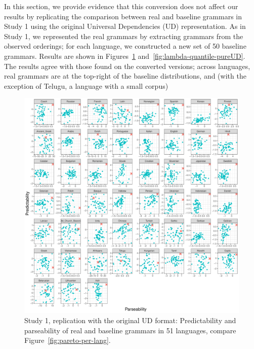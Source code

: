 \documentclass[10pt,twoside,lineno]{article}
\begin{document}
In this section, we provide evidence that this conversion does not affect our results by replicating the comparison between real and baseline grammars in Study 1 using the original Universal Dependencies (UD) representation.
As in Study 1, we represented the real grammars by extracting grammars from the observed orderings; for each language, we constructed a new set of 50 baseline grammars.
Results are shown in Figures~\ref{fig:pareto-per-lang-pureUD} and~\ref{fig:lambda-quantile-pureUD}.
The results agree with those found on the converted versions; across languages, real grammars are at the top-right of the baseline distributions, and (with the exception of Telugu, a language with a small corpus) 





\begin{figure}
\centering
\includegraphics[width=\textwidth]{../results/plane/pureUD/pareto-plane-perLanguage-pureUD-mle.pdf}
	\caption[Predictability and Parseability]{Study 1, replication with the original UD format: Predictability and parseability of real and baseline grammars in 51 languages, compare Figure~\ref{fig:pareto-per-lang}.}\label{fig:pareto-per-lang-pureUD}
\end{figure}
\end{document}
